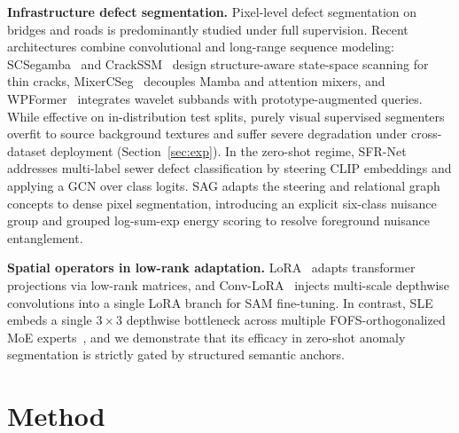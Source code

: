\documentclass[conference]{IEEEtran}
\newcommand{\sag}{SAG}
\newcommand{\sle}{SLE}
\begin{document}
\textbf{Infrastructure defect segmentation.} Pixel-level defect segmentation on bridges and roads is predominantly studied under full supervision. Recent architectures combine convolutional and long-range sequence modeling: SCSegamba~\cite{liu2025scsegamba} and CrackSSM~\cite{gu2026crackssm} design structure-aware state-space scanning for thin cracks, MixerCSeg~\cite{zhao2026mixercseg} decouples Mamba and attention mixers, and WPFormer~\cite{yan2025wpformer} integrates wavelet subbands with prototype-augmented queries. While effective on in-distribution test splits, purely visual supervised segmenters overfit to source background textures and suffer severe degradation under cross-dataset deployment (Section~\ref{sec:exp}). In the zero-shot regime, SFR-Net~\cite{chen2026sfrnet} addresses multi-label sewer defect classification by steering CLIP embeddings and applying a GCN over class logits. \sag{} adapts the steering and relational graph concepts to dense pixel segmentation, introducing an explicit six-class nuisance group and grouped log-sum-exp energy scoring to resolve foreground nuisance entanglement.

\textbf{Spatial operators in low-rank adaptation.} LoRA~\cite{hu2022lora} adapts transformer projections via low-rank matrices, and Conv-LoRA~\cite{zhong2024convlora} injects multi-scale depthwise convolutions into a single LoRA branch for SAM fine-tuning. In contrast, \sle{} embeds a single $3{\times}3$ depthwise bottleneck across multiple FOFS-orthogonalized MoE experts~\cite{shazeer2017moe,park2026moeclip}, and we demonstrate that its efficacy in zero-shot anomaly segmentation is strictly gated by structured semantic anchors.

\section{Method}
\end{document}
